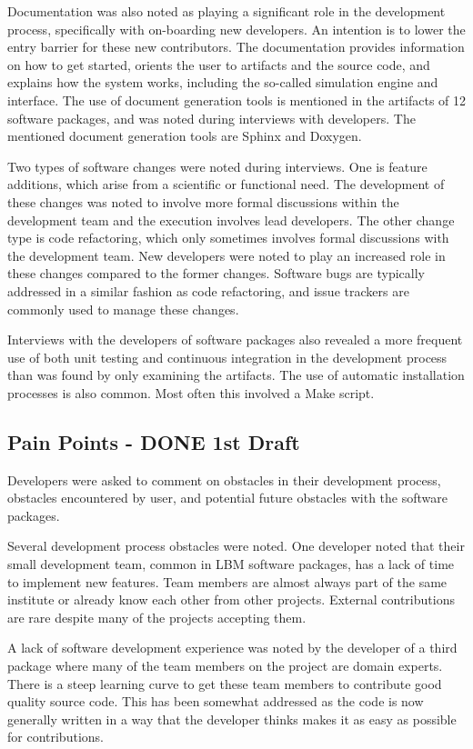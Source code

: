 \documentclass[12pt, notitlepage]{article}
\begin{document}
Documentation was also noted as playing a significant role in the development process, specifically with on-boarding new developers. An intention is to lower the entry barrier for these new contributors. The documentation provides information on how to get started, orients the user to artifacts and the source code, and explains how the system works, including the so-called simulation engine and interface. The use of document generation tools is mentioned in the artifacts of 12 software packages, and was noted during interviews with developers. The mentioned document generation tools are Sphinx and Doxygen. 

Two types of software changes were noted during interviews. One is feature additions, which arise from a scientific or functional need. The development of these changes was noted to involve more formal discussions within the development team and the execution involves lead developers. The other change type is code refactoring, which only sometimes involves formal discussions with the development team. New developers were noted to play an increased role in these changes compared to the former changes. Software bugs are typically addressed in a similar fashion as code refactoring, and issue trackers are commonly used to manage these changes. 

Interviews with the developers of software packages also revealed a more frequent use of both unit testing and continuous integration in the development process than was found by only examining the artifacts. The use of automatic installation processes is also common. Most often this involved a Make script.


\subsection{Pain Points - DONE 1st Draft}

Developers were asked to comment on obstacles in their development process, obstacles encountered by user, and potential future obstacles with the software packages. 

Several development process obstacles were noted. One developer noted that their small development team, common in LBM software packages, has a lack of time to implement new features.  Team members are almost always part of the same institute or already know each other from other projects. External contributions are rare despite many of the projects accepting them.

A lack of software development experience was noted by the developer of a third package where many of the team members on the project are domain experts. There is a steep learning curve to get these team members to contribute good quality source code. This has been somewhat addressed as the code is now generally written in a way that the developer thinks makes it as easy as possible for contributions. 
\end{document}
